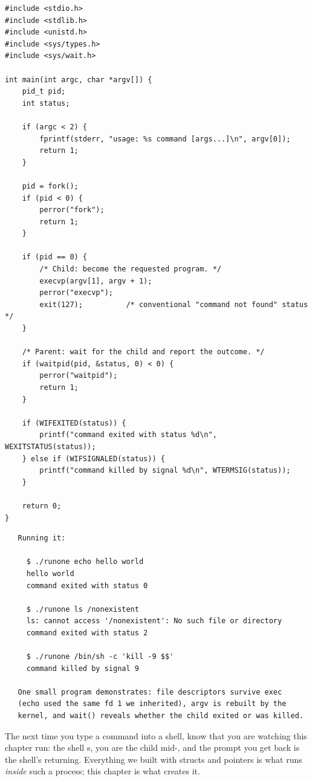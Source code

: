 \begin{lstlisting}[caption={runone.c: fork, exec, wait -- the whole chapter at once.}]
#include <stdio.h>
#include <stdlib.h>
#include <unistd.h>
#include <sys/types.h>
#include <sys/wait.h>

int main(int argc, char *argv[]) {
    pid_t pid;
    int status;

    if (argc < 2) {
        fprintf(stderr, "usage: %s command [args...]\n", argv[0]);
        return 1;
    }

    pid = fork();
    if (pid < 0) {
        perror("fork");
        return 1;
    }

    if (pid == 0) {
        /* Child: become the requested program. */
        execvp(argv[1], argv + 1);
        perror("execvp");
        exit(127);          /* conventional "command not found" status */
    }

    /* Parent: wait for the child and report the outcome. */
    if (waitpid(pid, &status, 0) < 0) {
        perror("waitpid");
        return 1;
    }

    if (WIFEXITED(status)) {
        printf("command exited with status %d\n", WEXITSTATUS(status));
    } else if (WIFSIGNALED(status)) {
        printf("command killed by signal %d\n", WTERMSIG(status));
    }

    return 0;
}
\end{lstlisting}

\begin{verbatim}
   Running it:

     $ ./runone echo hello world
     hello world
     command exited with status 0

     $ ./runone ls /nonexistent
     ls: cannot access '/nonexistent': No such file or directory
     command exited with status 2

     $ ./runone /bin/sh -c 'kill -9 $$'
     command killed by signal 9

   One small program demonstrates: file descriptors survive exec
   (echo used the same fd 1 we inherited), argv is rebuilt by the
   kernel, and wait() reveals whether the child exited or was killed.
\end{verbatim}

The next time you type a command into a shell, know that you are
watching this chapter run: the shell s, you are the child
mid-, and the prompt you get back is the shell's
 returning. Everything we built with structs and pointers
is what runs \emph{inside} such a process; this chapter is what creates
it.

